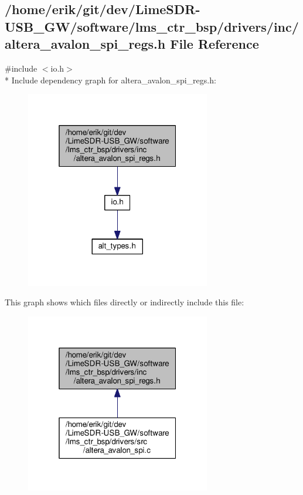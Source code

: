 \subsection{/home/erik/git/dev/\+Lime\+S\+D\+R-\/\+U\+S\+B\+\_\+\+G\+W/software/lms\+\_\+ctr\+\_\+bsp/drivers/inc/altera\+\_\+avalon\+\_\+spi\+\_\+regs.h File Reference}
\label{altera__avalon__spi__regs_8h}
{\ttfamily \#include $<$io.\+h$>$}\\*
Include dependency graph for altera\+\_\+avalon\+\_\+spi\+\_\+regs.\+h\+:
\nopagebreak
\begin{figure}[H]
\begin{center}
\leavevmode
\includegraphics[width=229pt]{d9/d9d/altera__avalon__spi__regs_8h__incl}
\end{center}
\end{figure}
This graph shows which files directly or indirectly include this file\+:
\nopagebreak
\begin{figure}[H]
\begin{center}
\leavevmode
\includegraphics[width=229pt]{da/d79/altera__avalon__spi__regs_8h__dep__incl}
\end{center}
\end{figure}

